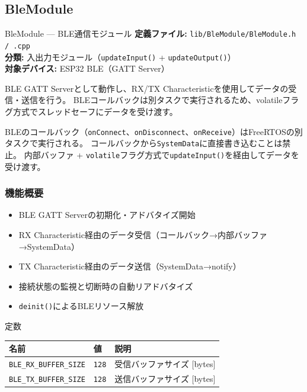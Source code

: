 \subsection{BleModule}

\begin{apibox}{BleModule --- BLE通信モジュール}
\textbf{定義ファイル:} \texttt{lib/BleModule/BleModule.h / .cpp}\\
\textbf{分類:} 入出力モジュール（\texttt{updateInput()} + \texttt{updateOutput()}）\\
\textbf{対象デバイス:} ESP32 BLE（GATT Server）

BLE GATT Serverとして動作し、RX/TX Characteristicを使用してデータの受信・送信を行う。
BLEコールバックは別タスクで実行されるため、volatileフラグ方式でスレッドセーフにデータを受け渡す。
\end{apibox}

\begin{cautionbox}[スレッドセーフティ]
BLEのコールバック（\texttt{onConnect}、\texttt{onDisconnect}、\texttt{onReceive}）はFreeRTOSの別タスクで実行される。
コールバックから\texttt{SystemData}に直接書き込むことは禁止。
内部バッファ + \texttt{volatile}フラグ方式で\texttt{updateInput()}を経由してデータを受け渡す。
\end{cautionbox}

\subsubsection{機能概要}

\begin{itemize}
    \item BLE GATT Serverの初期化・アドバタイズ開始
    \item RX Characteristic経由のデータ受信（コールバック→内部バッファ→SystemData）
    \item TX Characteristic経由のデータ送信（SystemData→notify）
    \item 接続状態の監視と切断時の自動リアドバタイズ
    \item \texttt{deinit()}によるBLEリソース解放
\end{itemize}

\begin{funcblock}{定数}
\begin{tabularx}{\textwidth}{l l X}
\toprule
\textbf{名前} & \textbf{値} & \textbf{説明} \\
\midrule
\texttt{BLE\_RX\_BUFFER\_SIZE} & \texttt{128} & 受信バッファサイズ [bytes] \\
\texttt{BLE\_TX\_BUFFER\_SIZE} & \texttt{128} & 送信バッファサイズ [bytes] \\
\bottomrule
\end{tabularx}
\end{funcblock}

